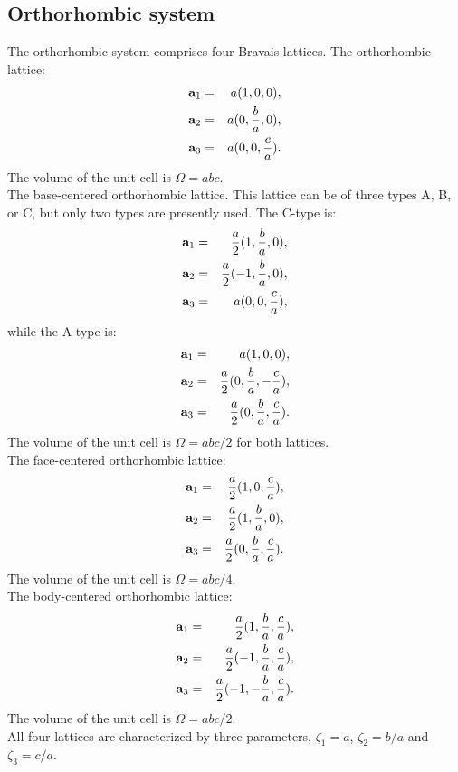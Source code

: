 \documentclass[12pt,a4paper]{article}
\begin{document}
\subsection{\color{web-blue}Orthorhombic system}
The orthorhombic system comprises four Bravais lattices.
The orthorhombic lattice:
\begin{eqnarray}
{\bf a}_1 &=& a (1, 0, 0), \nonumber \\
{\bf a}_2 &=& a (0, {b\over a}, 0), \nonumber \\
{\bf a}_3 &=& a (0, 0, {c\over a}). \nonumber
\nonumber
\end{eqnarray}
The volume of the unit cell is $\Omega = abc$. \\
The base-centered orthorhombic lattice. This lattice can be of three
types A, B, or C, but only two types are presently used. 
The C-type is:
\begin{eqnarray}
{\bf a}_1 &=& {a \over 2} (1, {b \over a}, 0), \nonumber \\
{\bf a}_2 &=& {a \over 2} (-1, {b \over a}, 0), \nonumber \\
{\bf a}_3 &=& a  (0, 0, {c \over a}), \nonumber
\nonumber
\end{eqnarray}
while the A-type is:
\begin{eqnarray}
{\bf a}_1 &=& a  (1, 0, 0), \nonumber \\
{\bf a}_2 &=& {a \over 2} (0, {b \over a}, -{c \over a}), \nonumber \\
{\bf a}_3 &=& {a \over 2} (0, {b \over a}, {c \over a}). \nonumber 
\nonumber
\end{eqnarray}
The volume of the unit cell is $\Omega = abc/2$ for both lattices. \\
The face-centered orthorhombic lattice:
\begin{eqnarray}
{\bf a}_1 &=& {a \over 2} (1, 0, {c \over a}), \nonumber \\
{\bf a}_2 &=& {a \over 2} (1, {b \over a}, 0), \nonumber \\
{\bf a}_3 &=& {a \over 2} (0, {b \over a}, {c \over a}). \nonumber
\nonumber
\end{eqnarray}
The volume of the unit cell is $\Omega = abc/4$. \\
The body-centered orthorhombic lattice:
\begin{eqnarray}
{\bf a}_1 &=& {a \over 2} (1, {b \over a}, {c \over a}), \nonumber \\
{\bf a}_2 &=& {a \over 2} (-1, {b \over a}, {c \over a}), \nonumber \\
{\bf a}_3 &=& {a \over 2} (-1, -{b \over a}, {c \over a}). \nonumber
\nonumber
\end{eqnarray}
The volume of the unit cell is $\Omega = abc/2$. \\
All four lattices are characterized by three parameters, 
$\zeta_1=a$, $\zeta_2=b/a$ and $\zeta_3=c/a$.
\end{document}
